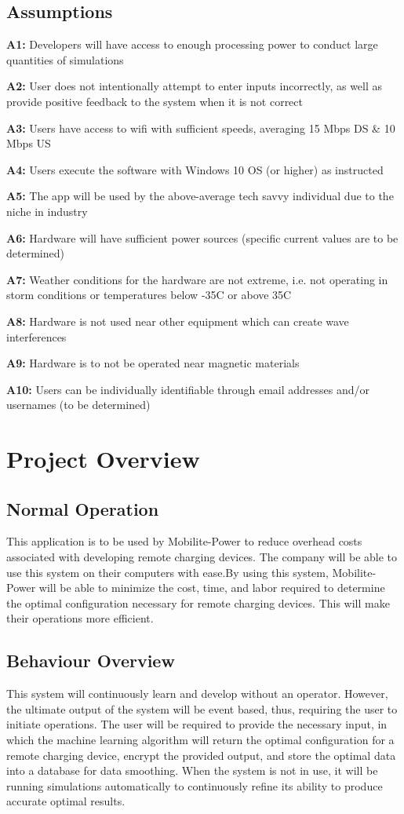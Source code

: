 \documentclass[12pt, titlepage]{article}
\begin{document}
\subsection{Assumptions}
\par 
\textbf{A1:} Developers will have access to enough processing power to conduct large quantities of simulations
\par
\textbf{A2:} User does not intentionally attempt to enter inputs incorrectly, as well as provide positive feedback to the system when it is not correct
\par
\textbf{A3:} Users have access to wifi with sufficient speeds, averaging 15 Mbps DS \& 10 Mbps US
\par
\textbf{A4:} Users execute the software with Windows 10 OS (or higher) as instructed
\par 
\textbf{A5:} The app will be used by the above-average tech savvy individual due to the niche in industry
\par
\textbf{A6:} Hardware will have sufficient power sources (specific current values are to be determined)
\par
\textbf{A7:} Weather conditions for the hardware are not extreme, i.e. not operating in storm conditions or temperatures below -35C or above 35C
\par
\textbf{A8:} Hardware is not used near other equipment which can create wave interferences 
\par 
\textbf{A9:} Hardware is to not be operated near magnetic materials
\par
\textbf{A10:} Users can be individually identifiable through email addresses and/or usernames (to be determined)

\section{Project Overview}
\subsection{Normal Operation}

This application is to be used by Mobilite-Power to reduce overhead costs associated with developing remote charging devices. The company will be able to use this system on their computers with ease.By using this system, Mobilite-Power will be able to minimize the cost, time, and labor required to determine the optimal configuration necessary for remote charging devices. This will make their operations more efficient.
\subsection{Behaviour Overview}
This system will continuously learn and develop without an operator. However, the ultimate output of the system will be event based, thus, requiring the user to initiate operations. The user will be required to provide the necessary input, in which the machine learning algorithm will return the optimal configuration for a remote charging device, encrypt the provided output, and store the optimal data into a database for data smoothing. When the system is not in use, it will be running simulations automatically to continuously refine its ability to produce accurate optimal results.
\end{document}

